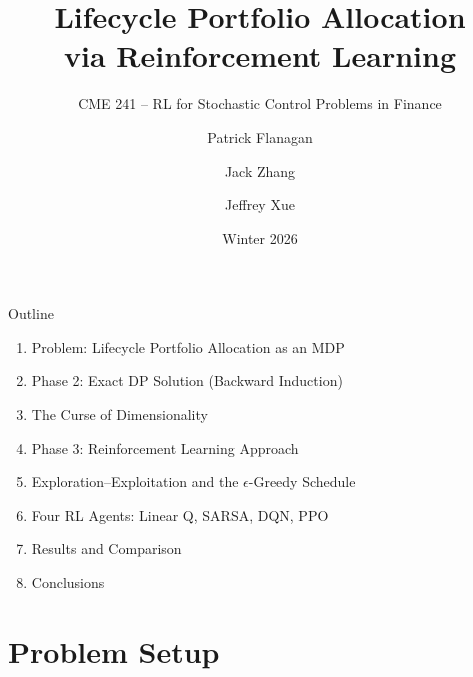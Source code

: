 \documentclass[aspectratio=169, 11pt]{beamer}
\title{Lifecycle Portfolio Allocation\\via Reinforcement Learning}
\subtitle{CME 241 -- RL for Stochastic Control Problems in Finance}
\author{Patrick Flanagan \and Jack Zhang \and Jeffrey Xue}
\date{Winter 2026}
\begin{document}
\begin{frame}
\titlepage
\end{frame}
\begin{frame}{Outline}
\begin{enumerate}
    \item Problem: Lifecycle Portfolio Allocation as an MDP
    \item Phase 2: Exact DP Solution (Backward Induction)
    \item The Curse of Dimensionality
    \item Phase 3: Reinforcement Learning Approach
    \item Exploration--Exploitation and the $\epsilon$-Greedy Schedule
    \item Four RL Agents: Linear Q, SARSA, DQN, PPO
    \item Results and Comparison
    \item Conclusions
\end{enumerate}
\end{frame}
\section{Problem Setup}
\end{document}
